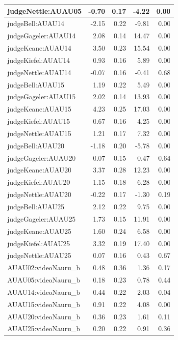 \documentclass{monashthesis}
\begin{document}
\begin{tabular}{l|r|r|r|r}
\hline
judgeNettle:AUAU05 & -0.70 & 0.17 & -4.22 & 0.00\\
\hline
judgeBell:AUAU14 & -2.15 & 0.22 & -9.81 & 0.00\\
\hline
judgeGageler:AUAU14 & 2.08 & 0.14 & 14.47 & 0.00\\
\hline
judgeKeane:AUAU14 & 3.50 & 0.23 & 15.54 & 0.00\\
\hline
judgeKiefel:AUAU14 & 0.93 & 0.16 & 5.89 & 0.00\\
\hline
judgeNettle:AUAU14 & -0.07 & 0.16 & -0.41 & 0.68\\
\hline
judgeBell:AUAU15 & 1.19 & 0.22 & 5.49 & 0.00\\
\hline
judgeGageler:AUAU15 & 2.02 & 0.14 & 13.93 & 0.00\\
\hline
judgeKeane:AUAU15 & 4.23 & 0.25 & 17.03 & 0.00\\
\hline
judgeKiefel:AUAU15 & 0.67 & 0.16 & 4.25 & 0.00\\
\hline
judgeNettle:AUAU15 & 1.21 & 0.17 & 7.32 & 0.00\\
\hline
judgeBell:AUAU20 & -1.18 & 0.20 & -5.78 & 0.00\\
\hline
judgeGageler:AUAU20 & 0.07 & 0.15 & 0.47 & 0.64\\
\hline
judgeKeane:AUAU20 & 3.37 & 0.28 & 12.23 & 0.00\\
\hline
judgeKiefel:AUAU20 & 1.15 & 0.18 & 6.28 & 0.00\\
\hline
judgeNettle:AUAU20 & -0.22 & 0.17 & -1.30 & 0.19\\
\hline
judgeBell:AUAU25 & 2.12 & 0.22 & 9.75 & 0.00\\
\hline
judgeGageler:AUAU25 & 1.73 & 0.15 & 11.91 & 0.00\\
\hline
judgeKeane:AUAU25 & 1.60 & 0.24 & 6.58 & 0.00\\
\hline
judgeKiefel:AUAU25 & 3.32 & 0.19 & 17.40 & 0.00\\
\hline
judgeNettle:AUAU25 & 0.07 & 0.16 & 0.43 & 0.67\\
\hline
AUAU02:videoNauru\_b & 0.48 & 0.36 & 1.36 & 0.17\\
\hline
AUAU05:videoNauru\_b & 0.18 & 0.23 & 0.78 & 0.44\\
\hline
AUAU14:videoNauru\_b & 0.44 & 0.22 & 2.03 & 0.04\\
\hline
AUAU15:videoNauru\_b & 0.91 & 0.22 & 4.08 & 0.00\\
\hline
AUAU20:videoNauru\_b & 0.36 & 0.23 & 1.61 & 0.11\\
\hline
AUAU25:videoNauru\_b & 0.20 & 0.22 & 0.91 & 0.36\\

\end{tabular}
\end{document}
